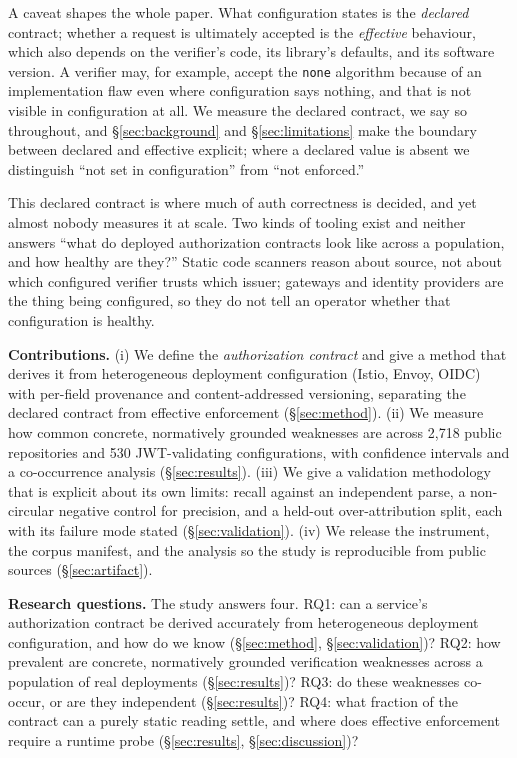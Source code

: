 A caveat shapes the whole paper. What configuration states is the \emph{declared}
contract; whether a request is ultimately accepted is the \emph{effective}
behaviour, which also depends on the verifier's code, its library's defaults, and
its software version. A verifier may, for example, accept the \texttt{none}
algorithm because of an implementation flaw even where configuration says nothing,
and that is not visible in configuration at all. We measure the declared contract,
we say so throughout, and \S\ref{sec:background} and \S\ref{sec:limitations} make
the boundary between declared and effective explicit; where a declared value is
absent we distinguish ``not set in configuration'' from ``not enforced.''

This declared contract is where much of auth correctness is decided, and yet almost
nobody measures it at scale. Two kinds of tooling exist and neither answers ``what
do deployed authorization contracts look like across a population, and how healthy
are they?'' Static code scanners reason about source, not about which configured
verifier trusts which issuer; gateways and identity providers are the thing being
configured, so they do not tell an operator whether that configuration is healthy.

\noindent\textbf{Contributions.}
(i) We define the \emph{authorization contract} and give a method that derives it
from heterogeneous deployment configuration (Istio, Envoy, OIDC) with per-field
provenance and content-addressed versioning, separating the declared contract from
effective enforcement (\S\ref{sec:method}).
(ii) We measure how common concrete, normatively grounded weaknesses are across
2{,}718 public repositories and 530 JWT-validating configurations, with confidence
intervals and a co-occurrence analysis (\S\ref{sec:results}).
(iii) We give a validation methodology that is explicit about its own limits:
recall against an independent parse, a non-circular negative control for precision,
and a held-out over-attribution split, each with its failure mode stated
(\S\ref{sec:validation}).
(iv) We release the instrument, the corpus manifest, and the analysis so the study
is reproducible from public sources (\S\ref{sec:artifact}).

\noindent\textbf{Research questions.} The study answers four. RQ1: can a service's
authorization contract be derived accurately from heterogeneous deployment
configuration, and how do we know (\S\ref{sec:method}, \S\ref{sec:validation})? RQ2:
how prevalent are concrete, normatively grounded verification weaknesses across a
population of real deployments (\S\ref{sec:results})? RQ3: do these weaknesses
co-occur, or are they independent (\S\ref{sec:results})? RQ4: what fraction of the
contract can a purely static reading settle, and where does effective enforcement
require a runtime probe (\S\ref{sec:results}, \S\ref{sec:discussion})?

